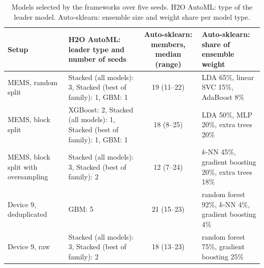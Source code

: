 \begin{table}[t]
\centering
\caption{Models selected by the frameworks over five seeds. H2O AutoML: type of the leader model. Auto-sklearn: ensemble size and weight share per model type.}
\label{tab:models}
\scriptsize
\setlength{\tabcolsep}{3pt}
\begin{tabular}{@{}lp{1.8in}cp{1.9in}@{}}
\toprule
Setup & H2O AutoML: leader type and number of seeds & Auto-sklearn: members, median (range) & Auto-sklearn: share of ensemble weight \\
\midrule
MEMS, random split & Stacked (all models): 3, Stacked (best of family): 1, GBM: 1 & 19 (11--22) & LDA 65\%, linear SVC 15\%, AdaBoost 8\% \\
MEMS, block split & XGBoost: 2, Stacked (all models): 1, Stacked (best of family): 1, GBM: 1 & 18 (8--25) & LDA 50\%, MLP 20\%, extra trees 20\% \\
MEMS, block split with oversampling & Stacked (all models): 3, Stacked (best of family): 2 & 12 (7--24) & $k$-NN 45\%, gradient boosting 20\%, extra trees 18\% \\
\midrule
Device 9, deduplicated & GBM: 5 & 21 (15--23) & random forest 92\%, $k$-NN 4\%, gradient boosting 4\% \\
Device 9, raw & Stacked (all models): 3, Stacked (best of family): 2 & 18 (13--23) & random forest 75\%, gradient boosting 25\% \\
\bottomrule
\end{tabular}
\end{table}
